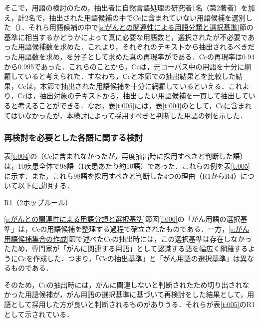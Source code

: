 \documentclass[japanese]{jnlp_1.4}
\def\maru#1{}
\renewcommand{\paragraph}{}
\begin{document}
そこで，用語の検討のため，抽出者に自然言語処理の研究者1名（第2著者）を加え，計2名で，抽出された用語候補の中でCcに含まれていない用語候補を選別した（\maru{4}）．それら用語候補の中で\ref{s:がんとの関連性による用語分類と選択基準}節の基準に相当するかどうかによって真に必要な用語数\maru{5}と，選択されたが不必要であった用語候補数\maru{6}を求めた．これより，それぞれのテキストから抽出されるべきだった用語数\maru{7}を求め，\maru{2}を分子として求めた真の再現率が\maru{8}である．Ccの再現率\maru{8}は0.94から0.995であった．これらのことから，Ccは，元コーパス中の用語を十分に網羅していると考えられた．すなわち，Ccと本節での抽出結果とを比較した結果，Ccは，本節で抽出された用語候補を十分に網羅しているといえる．これより，Ccは，抽出対象のテキストから，抽出したい用語候補を一貫して抽出していると考えることができる．なお，表\ref{t:005}には，表\ref{t:004}の\maru{5}として，Ccに含まれてはいなかったが，本検討によって採用すべきと判断した用語の例を示した．



\subsubsection{再検討を必要とした各語に関する検討}
\label{s:再検討を必要とした各語に関する検討}

表\ref{t:004}の\maru{5}（Ccに含まれなかったが，再度抽出時に採用すべきと判断した語）は，10疾患全体で98語（1疾患あたり約10語）であった．これらの例を表\ref{t:005}に示す．また，これら98語を採用すべきと判断した4つの理由（R1からR4）について以下に説明する．

\begin{table}[b]
 \caption{表\ref{t:004}の\textcircled{\small 5}（Ccになかったが再検討時採用すべきと思われた）語数と例}

\label{t:005}
\end{table}


\paragraph{R1（2ホップルール）}
\label{s:R1（2ホップルール）}

\ref{s:がんとの関連性による用語分類と選択基準}節図\ref{f:006}の「がん用語の選択基準」は，Ccの用語候補を整理する過程で確立されたものである．一方，\ref{s:がん用語候補集合の作成}節で述べたCcの抽出時には，この選択基準は存在しなかったため，専門家が「がんに関連する用語」として認識する語を幅広く網羅するようにCcを作成した．つまり，「Ccの抽出基準」と「がん用語の選択基準」は異なるものである．

そのため，Ccの抽出時には，がんに関連しないと判断されたため切り出されなかった用語候補が，がん用語の選択基準に基づいて再検討をした結果として，用語として採用した方が良いと判断されるものがありうる．それらが表\ref{t:005}のR1として示されている．
\end{document}
